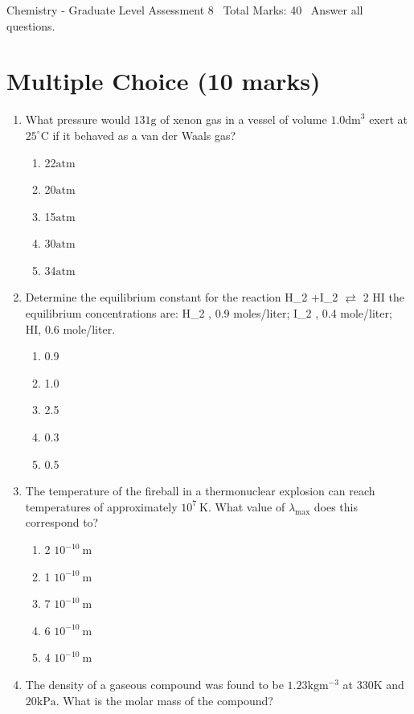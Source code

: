 \documentclass[12pt]{article}
\begin{document}
\begin{center}
Chemistry - Graduate Level Assessment 8 \
Total Marks: 40 \
Answer all questions.
\end{center}

\section*{Multiple Choice (10 marks)}
\begin{enumerate}[label=\arabic*.]
\item What pressure would $131 \mathrm{g}$ of xenon gas in a vessel of volume $1.0 \mathrm{dm}^3$ exert at $25^{\circ} \mathrm{C}$ if it behaved as a van der Waals gas?
\begin{enumerate}[label=(\alph*)]
    \item 22$\mathrm{atm}$
    \item 20$\mathrm{atm}$
    \item 15$\mathrm{atm}$
    \item 30$\mathrm{atm}$
    \item 34$\mathrm{atm}$
\end{enumerate}
\item Determine the equilibrium constant for the reaction H\_2 +I\_2 \ensuremath{\rightleftarrows} 2 HI the equilibrium concentrations are: H\_2 , 0.9 moles/liter; I\_2 , 0.4 mole/liter; HI, 0.6 mole/liter.
\begin{enumerate}[label=(\alph*)]
    \item 0.9
    \item 1.0
    \item 2.5
    \item 0.3
    \item 0.5
\end{enumerate}
\item The temperature of the fireball in a thermonuclear explosion can reach temperatures of approximately $10^7 \mathrm{~K}$. What value of $\lambda_{\max }$ does this correspond to?
\begin{enumerate}[label=(\alph*)]
    \item 2 $10^{-10} \mathrm{~m}$
    \item 1 $10^{-10} \mathrm{~m}$
    \item 7 $10^{-10} \mathrm{~m}$
    \item 6 $10^{-10} \mathrm{~m}$
    \item 4 $10^{-10} \mathrm{~m}$
\end{enumerate}
\item The density of a gaseous compound was found to be $1.23 \mathrm{kg} \mathrm{m}^{-3}$ at $330 \mathrm{K}$ and $20 \mathrm{kPa}$. What is the molar mass of the compound?

\end{enumerate}
\end{document}
